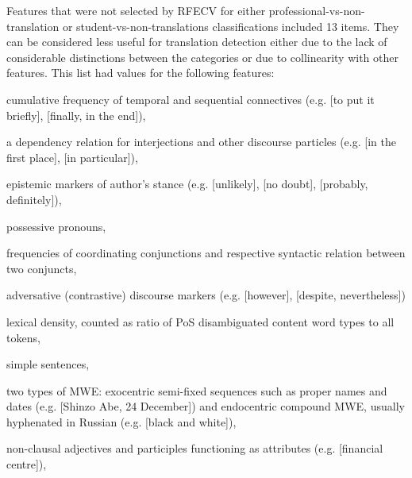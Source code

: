 Features that were not selected by RFECV for either professional-vs-non-translation or student-vs-non-translations classifications included 13 items. They can be considered less useful for translation detection either due to the lack of considerable distinctions between the categories or due to collinearity with other features. This list had values for the following features:
\begin{description}\compresslist{}\label{pg:rfe_useless}
	\item[tempseq:] cumulative frequency of temporal and sequential connectives (e.g.  [to put it briefly],  [finally, in the end]),
	\item[discourse:] a dependency relation for interjections and other discourse particles (e.g.  [in the first place],  [in particular]),
	\item[epist:] epistemic markers of author's stance (e.g.  [unlikely],  [no doubt],  [probably, definitely]),
	\item[possp:] possessive pronouns,
	\item[cconj, conj:] frequencies of coordinating conjunctions and respective syntactic relation between two conjuncts, 
	\item[advers:] adversative (contrastive) discourse markers (e.g.  [however],  [despite, nevertheless])
	\item lexical density, counted as ratio of PoS disambiguated content word types to all tokens,
	\item simple sentences,
	\item[flat, compound:] two types of \gls{MWE}: exocentric semi-fixed sequences such as proper names and dates (e.g.  [Shinzo Abe, 24 December]) and endocentric compound MWE, usually hyphenated in Russian (e.g.  [black and white]),
	\item[amod:] non-clausal adjectives and participles functioning as attributes (e.g.  [financial centre]), %

\end{description}
